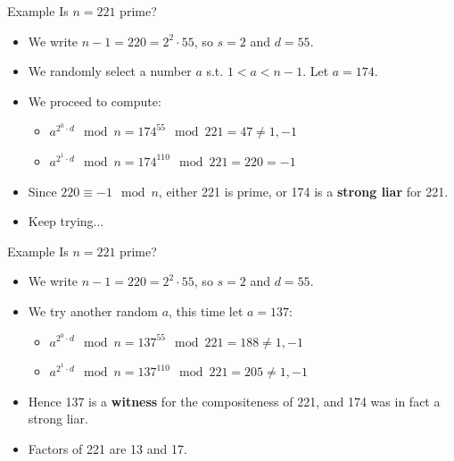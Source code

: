 \documentclass{beamer}
\begin{document}
\begin{frame}{Example}
Is $n = 221$ prime?
    \begin{itemize}
        \item We write $n - 1 = 220 = 2^2 \cdot 55$, so $s = 2$ and $d = 55$.
        \item We randomly select a number $a$ s.t. $1 < a < n - 1$. Let $a = 174$. 
        \item We proceed to compute:
        \begin{itemize}
            \item $a^{2^0 \cdot d} \mod n = 174^{55} \mod 221 = 47 \neq 1,- 1$
            \item $a^{2^1 \cdot d} \mod n = 174^{110} \mod 221 = 220 = -1$
        \end{itemize}
        \item Since $220 \equiv −1 \mod n$, either 221 is prime, or 174 is a \textbf{strong liar} for 221.
        \item Keep trying...
    \end{itemize}
\end{frame}

\begin{frame}{Example}
Is $n = 221$ prime?
    \begin{itemize}
        \item We write $n - 1 = 220 = 2^2 \cdot 55$, so $s = 2$ and $d = 55$.
        \item We try another random $a$, this time let $a = 137$:
        \begin{itemize}
            \item $a^{2^0 \cdot d} \mod n = 137^{55} \mod 221 = 188 \neq 1, -1$
            \item $a^{2^1 \cdot d} \mod n = 137^{110} \mod 221 = 205 \neq 1, -1$
        \end{itemize}
        \item Hence 137 is a \textbf{witness} for the compositeness of 221, and 174 was in fact a strong liar.
        \item Factors of 221 are 13 and 17.
    \end{itemize}
\end{frame}
\end{document}
